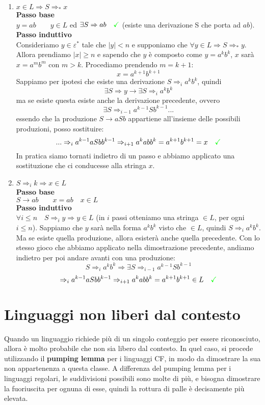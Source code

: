 \documentclass[a4paper,oneside]{scrbook}
\newcommand{\greenmark}{\quad \textcolor{green}{\checkmark}}
\begin{document}
\begin{enumerate}
	\item $x\in L \Rightarrow S \Rightarrow_* x $\\
	\textbf{Passo base}\\
	$y=ab \qquad y \in L$ ed $\exists S\Rightarrow ab \greenmark$ (esiste una derivazione S che porta ad $ab$).\\
	\textbf{Passo induttivo}\\
	Consideriamo $y \in \varepsilon^*$ tale che $|y|<n$ e supponiamo che $\forall y \in L \Rightarrow S \Rightarrow_* y$.\\
	Allora prendiamo $|x|\geq n$ e sapendo che $y$ è composto come $y=a^kb^k$, $x$ sarà $x=a^mb^m$ con $m>k$. Procediamo prendendo $m=k+1$:
	$$ x=a^{k+1}b^{k+1}$$
	Sappiamo per ipotesi che esiste una derivazione  $S\Rightarrow_i a^kb^k$, quindi
	$$\exists S \Rightarrow y \rightarrow \exists S \Rightarrow_i a^kb^k$$
	ma se esiste questa esiste anche la derivazione precedente, ovvero
	$$\exists S \Rightarrow_{i-1} a^{k-1}Sb^{k-1} ...$$
	essendo che la produzione $S\rightarrow aSb$ appartiene all'insieme delle possibili produzioni, posso sostituire:
	$$... \Rightarrow_i a^{k-1}aSbb^{k-1} \Rightarrow_{i+1} a^kabb^k = a^{k+1}b^{k+1} = x \greenmark$$
	In pratica siamo tornati indietro di un passo e abbiamo applicato una sostituzione che ci conducesse alla stringa $x$.
	
	\item $ S \Rightarrow_i k \Rightarrow x \in L$\\
	\textbf{Passo base}\\
	$S\rightarrow ab \qquad x=ab \quad x \in L$\\
	\textbf{Passo induttivo}\\
	$\forall i \leq n \quad S \Rightarrow_i y \Rightarrow y \in L $ (in $i$ passi otteniamo una stringa $\in L$, per ogni $i\leq n$).
	Sappiamo che $y$ sarà nella forma $a^kb^k$ visto che $\in L$, quindi $S \Rightarrow_i a^kb^k$. Ma se esiste quella produzione, allora
	esisterà anche quella precedente. Con lo stesso gioco che abbiamo applicato nella dimostrazione precedente, andiamo indietro per poi
	andare avanti con una produzione:
	$$S \Rightarrow_i a^kb^k \Rightarrow \exists S \Rightarrow_{i-1} a^{k-1}Sb^{k-1}$$
	$$\Rightarrow_i a^{k-1}aSbb^{k-1} \Rightarrow_{i+1} a^kabb^k = a^{k+1}b^{k+1} \in L \greenmark$$
\end{enumerate}

\chapter{Linguaggi non liberi dal contesto}
Quando un linguaggio richiede più di un singolo conteggio per essere riconosciuto, allora è molto probabile che non sia libero dal contesto.
In quel caso, si procede utilizzando il \textbf{pumping lemma} per i linguaggi CF, in modo da dimostrare la sua non appartenenza a questa classe.
A differenza del pumping lemma per i linguaggi regolari, le suddivisioni possibili sono molte di più, e bisogna dimostrare la fuoriuscita per ognuna di esse, quindi la rottura di palle è decisamente più elevata.
\end{document}
